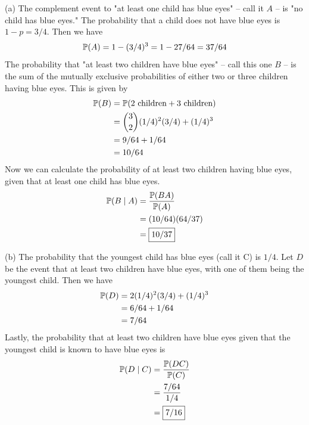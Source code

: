 \documentclass[a4paper]{article}
\begin{document}
\newpage

(a) The complement event to "at least one child has blue eyes" -- call it \(A\) -- is "no child has blue eyes." The probability that a child does not have blue eyes is \(1 - p = 3/4\). Then we have
\[
	\mathbb{P}(A) = 1 - (3/4)^{3} = 1 - 27/64 = 37/64
\]
The probability that "at least two children have blue eyes" -- call this one \(B\) -- is the sum of the mutually exclusive probabilities of either two or three children having blue eyes. This is given by
\begin{align*}
	\mathbb{P}(B) & = \mathbb{P}(\text{2 children} + \text{3 children}) \\
		 & = \binom{3}{2} (1/4)^{2} (3/4) + (1/4)^{3} \\
		 & = 9/64 + 1/64 \\
		 & = 10/64
\end{align*}
Now we can calculate the probability of at least two children having blue eyes, given that at least one child has blue eyes.
\begin{align*}
	\mathbb{P}(B \mid A) & = \frac{\mathbb{P}(BA)}{\mathbb{P}(A)} \\
	 & = (10/64)(64/37) \\
	 & = \boxed{10/37}
\end{align*}
\par (b) The probability that the youngest child has blue eyes (call it C) is \(1/4\). Let \(D\) be the event that at least two children have blue eyes, with one of them being the youngest child. Then we have
\begin{align*}
	\mathbb{P}(D) & = 2(1/4)^{2}(3/4) + (1/4)^{3} \\
	 & = 6/64 + 1/64 \\
         & = 7/64
\end{align*}
Lastly, the probability that at least two children have blue eyes given that the youngest child is known to have blue eyes is
\begin{align*}
	\mathbb{P}(D \mid C) & = \frac{\mathbb{P}(DC)}{\mathbb{P}(C)} \\
	 & = \frac{7/64}{1/4} \\
	 & = \boxed{7/16}
\end{align*}
\end{document}
